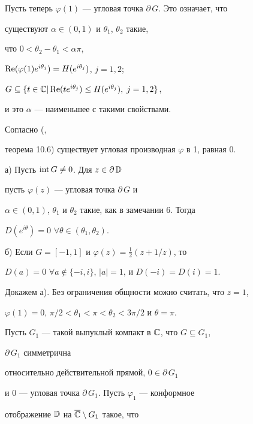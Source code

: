 \begin{pf}
Пусть теперь $\varphi(1)$ --- угловая точка $\partial\, G$. Это означает, что 


существуют $\alpha\in(0,1)$ и $\theta_1$, $\theta_2$ такие, 


что $0<\theta_2-\theta_1<\alpha\pi$, 


$\operatorname{Re}(\varphi(1)e^{i\theta_j})=H(e^{i\theta_j})$, $j=1,2$; 


$G\subseteq\{t\in\Bbb C\vert\R(te^{i\theta_j})\le H(e^{i\theta_j}),\;


j=1,2\}$, 


и это $\alpha$ --- наименьшее с такими свойствами. 


Согласно (\cite{Pomm}, 


теорема 10.6) существует угловая производная $\varphi$ в 1, равная 0. 


\end{pf} 


 


\begin{note} а) Пусть $\operatorname{int} G\ne 0$. Для $z\in \partial\, \Bbb D$ 


пусть $\varphi(z)$ --- угловая точка $\partial\, G$ и 


$\alpha\in(0,1)$, $\theta_1$ и $\theta_2$ такие, как в замечании 6. Тогда 


$D(e^{i\theta})=0$ $\forall \theta\in(\theta_1,\theta_2)$. 


 


б) Если $G=[-1,1]$ и $\varphi(z)=\frac12(z+1/z)$, то 


$D(a)=0$ $\forall a\notin\{-i,i\}$, $|a|=1$, и $D(-i)=D(i)=1$. 


\end{note}


 


Докажем а). Без ограничения общности можно считать, что $z=1$, 


$\varphi(1)=0$, $\pi/2<\theta_1<\pi<\theta_2<3\pi/2$ и $\theta=\pi$. 


Пусть $G_1$ --- такой выпуклый компакт в $\Bbb C$, что $G\subseteq G_1$, 


$\partial\, G_1$ симметрична 


относительно действительной прямой, $0\in\partial\, G_1$ 


и 0 --- угловая точка $\partial\, G_1$. Пусть $\varphi_1$ --- конформное 


отображение $\Bbb D$ на $\overline{\Bbb C}\setminus G_1$ такое, что 


